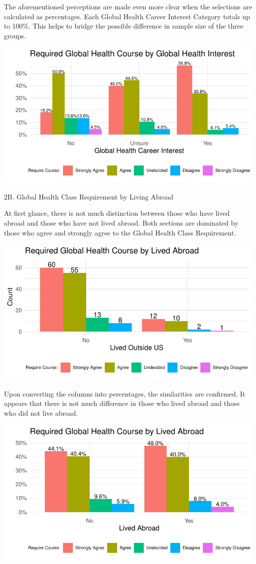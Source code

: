 \documentclass[
  letterpaper,
  DIV=11,
  numbers=noendperiod]{scrartcl}
\begin{document}
The aforementioned perceptions are made even more clear when the
selections are calculated as percentages. Each Global Health Career
Interest Category totals up to 100\%. This helps to bridge the possible
difference in sample size of the three groups.

\includegraphics{GlobalHealthQuartoHC_files/figure-pdf/unnamed-chunk-24-1.pdf}

\newpage

2B. Global Health Class Requirement by Living Abroad

At first glance, there is not much distinction between those who have
lived abroad and those who have not lived abroad. Both sections are
dominated by those who agree and strongly agree to the Global Health
Class Requirement.

\includegraphics{GlobalHealthQuartoHC_files/figure-pdf/unnamed-chunk-25-1.pdf}

Upon converting the columns into percentages, the similarities are
confirmed. It appears that there is not much difference in those who
lived abroad and those who did not live abroad.

\includegraphics{GlobalHealthQuartoHC_files/figure-pdf/unnamed-chunk-26-1.pdf}
\end{document}
